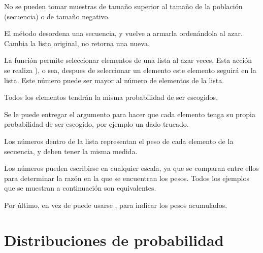 No se pueden tomar muestras de tamaño superior al tamaño de la población (secuencia) o de tamaño negativo.


El método  desordena una secuencia, y vuelve a armarla ordenándola al azar.
Cambia la lista original, no retorna una nueva.



La función  permite seleccionar elementos de una lista al azar  veces.
Esta acción se realiza ), o sea, despues de seleccionar un elemento este elemento seguirá en la lista.
Este número puede ser mayor al número de elementos de la lista.


Todos los elementos tendrán la misma probabilidad de ser escogidos.

Se le puede entregar el argumento  para hacer que cada elemento tenga su propia probabilidad de ser escogido, por ejemplo un dado trucado.


Los números dentro de la lista  representan el peso de cada elemento de la secuencia, y deben tener la misma medida.

Los números pueden escribirse en cualquier escala, ya que se comparan entre ellos para determinar la razón en la que se encuentran los pesos.
Todos los ejemplos que se muestran a continuación son equivalentes.


Por último, en vez de  puede usarse , para indicar los pesos acumulados.


\section{Distribuciones de probabilidad}

